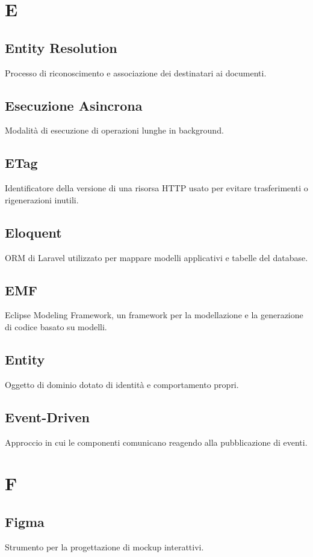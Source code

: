 \documentclass[a4paper,12pt]{article}
\begin{document}
\section{E}

\subsection{Entity Resolution}
Processo di riconoscimento e associazione dei destinatari ai documenti.

\subsection{Esecuzione Asincrona}
Modalità di esecuzione di operazioni lunghe in background.

\subsection{ETag}
Identificatore della versione di una risorsa HTTP usato per evitare trasferimenti o rigenerazioni inutili.

\subsection{Eloquent}
ORM di Laravel utilizzato per mappare modelli applicativi e tabelle del database.

\subsection{EMF}
Eclipse Modeling Framework, un framework per la modellazione e la generazione di codice basato su modelli.

\subsection{Entity}
Oggetto di dominio dotato di identità e comportamento propri.

\subsection{Event-Driven}
Approccio in cui le componenti comunicano reagendo alla pubblicazione di eventi.

\section{F}
\subsection{Figma}
Strumento per la progettazione di mockup interattivi.
\end{document}
